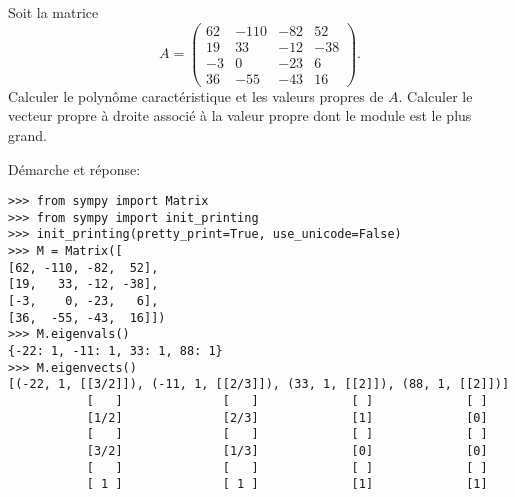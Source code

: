 \begin{question}[2 pts]
    Soit la matrice
    \[
    A = \left(\begin{array}{rrrr}
	    62 & -110 & -82 & 52 \\
	    19 & 33 & -12 & -38 \\
	    -3 & 0 & -23 & 6 \\
	    36 & -55 & -43 & 16
    \end{array}\right).
    \]
    Calculer le polynôme caractéristique et les valeurs propres de $A$.
    Calculer le vecteur propre à droite associé à la valeur propre dont le
    module est le plus grand.
\begin{mybox}
Démarche et réponse:
\begin{reponse}
\begin{verbatim}
>>> from sympy import Matrix
>>> from sympy import init_printing
>>> init_printing(pretty_print=True, use_unicode=False)
>>> M = Matrix([
[62, -110, -82,  52],
[19,   33, -12, -38],
[-3,    0, -23,   6],
[36,  -55, -43,  16]])
>>> M.eigenvals()
{-22: 1, -11: 1, 33: 1, 88: 1}
>>> M.eigenvects()
[(-22, 1, [[3/2]]), (-11, 1, [[2/3]]), (33, 1, [[2]]), (88, 1, [[2]])]
           [   ]              [   ]             [ ]             [ ]
           [1/2]              [2/3]             [1]             [0]
           [   ]              [   ]             [ ]             [ ]
           [3/2]              [1/3]             [0]             [0]
           [   ]              [   ]             [ ]             [ ]
           [ 1 ]              [ 1 ]             [1]             [1]
\end{verbatim}
\end{reponse}
\end{mybox}
\end{question}



